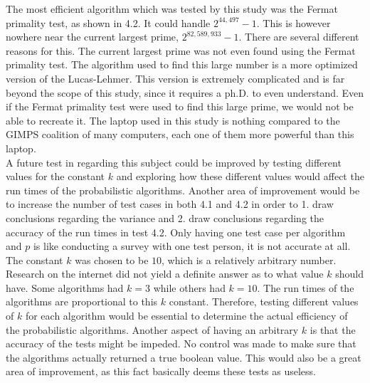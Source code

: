 \documentclass[main.tex]{subfiles}
\begin{document}
The most efficient algorithm which was tested by this study was the Fermat
primality test, as shown in 4.2. It could handle $2^{44,497}-1$. This is however
nowhere near the current largest prime, $2^{82,589,933}-1$. There are several
different reasons for this. The current largest prime was not even found using
the Fermat primality test. The algorithm used to find this large number is
a more optimized version of the Lucas-Lehmer. This version is extremely complicated and is far beyond the scope of this study, since it
requires a ph.D. to even understand. Even if the Fermat primality test were used
to find this large prime, we would not be able to recreate it. The laptop used
in this study is nothing compared to the GIMPS coalition of many computers, each
one of them more powerful than this laptop. \\

A future test in regarding this subject could be improved by testing different
values for the constant $k$ and exploring how these different values would
affect the run times of the probabilistic algorithms. Another area of
improvement would be to increase the number of test cases in both 4.1 and 4.2 in
order to 1. draw conclusions regarding the variance and 2. draw conclusions
regarding the accuracy of the run times in test 4.2. Only having one test case
per algorithm and $p$ is like conducting a survey with one test person, it is
not accurate at all. \\

The constant $k$ was chosen to be $10$, which is a relatively arbitrary number.
Research on the internet did not yield a definite answer as to what value $k$
should have. Some algorithms had $k = 3$ while others had $k = 10$. The run
times of the algorithms are proportional to this $k$ constant. Therefore,
testing different values of $k$ for each algorithm would be essential to
determine the actual efficiency of the probabilistic algorithms. Another aspect
of having an arbitrary $k$ is that the accuracy of the tests might be impeded.
No control was made to make sure that the algorithms actually returned a true
boolean value. This would also be a great area of improvement, as this fact
basically deems these tests as useless. \\ 
\end{document}
